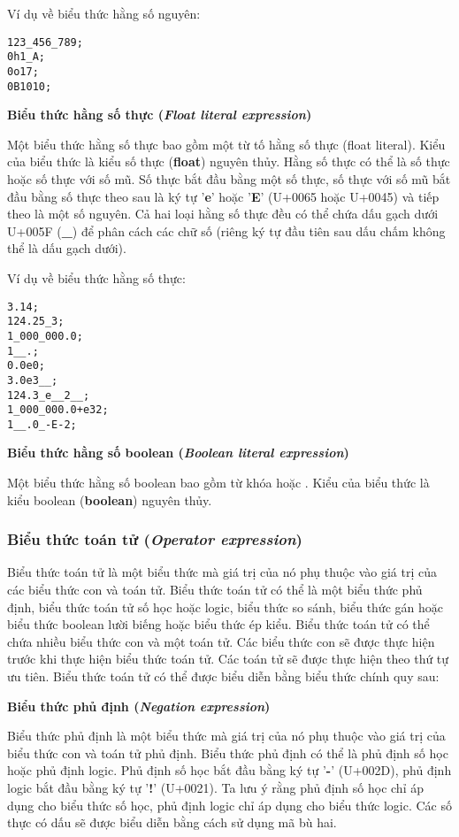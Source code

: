 \noindent Ví dụ về biểu thức hằng số nguyên:
\begin{lstlisting}[]
123_456_789;
0h1_A;
0o17;
0B1010;
\end{lstlisting}

\noindent\textbf{Biểu thức hằng số thực (\textit{Float literal expression})}

    Một biểu thức hằng số thực bao gồm một từ tố hằng số thực (float literal). Kiểu của biểu thức là kiểu số thực (\textbf{float}) nguyên thủy. Hằng số thực có thể là số thực hoặc số thực với số mũ. Số thực bắt đầu bằng một số thực, số thực với số mũ bắt đầu bằng số thực theo sau là ký tự '\textbf{e}' hoặc '\textbf{E}' (U+0065 hoặc U+0045) và tiếp theo là một số nguyên. Cả hai loại hằng số thực đều có thể chứa dấu gạch dưới U+005F (\textbf{\_}) để phân cách các chữ số (riêng ký tự đầu tiên sau dấu chấm không thể là dấu gạch dưới).

\noindent Ví dụ về biểu thức hằng số thực:
\begin{lstlisting}[]
3.14;
124.25_3;
1_000_000.0;
1__.;
0.0e0;
3.0e3__;
124.3_e__2__;
1_000_000.0+e32;
1__.0_-E-2;
\end{lstlisting}

\noindent\textbf{Biểu thức hằng số boolean (\textit{Boolean literal expression})}

    Một biểu thức hằng số boolean bao gồm từ khóa  hoặc . Kiểu của biểu thức là kiểu boolean (\textbf{boolean}) nguyên thủy.

\subsubsection{Biểu thức toán tử (\textit{Operator expression})}

    Biểu thức toán tử là một biểu thức mà giá trị của nó phụ thuộc vào giá trị của các biểu thức con và toán tử. Biểu thức toán tử có thể là một biểu thức phủ định, biểu thức toán tử số học hoặc logic, biểu thức so sánh, biểu thức gán hoặc biểu thức boolean lười biếng hoặc biểu thức ép kiểu. Biểu thức toán tử có thể chứa nhiều biểu thức con và một toán tử. Các biểu thức con sẽ được thực hiện trước khi thực hiện biểu thức toán tử. Các toán tử sẽ được thực hiện theo thứ tự ưu tiên. Biểu thức toán tử có thể được biểu diễn bằng biểu thức chính quy sau:

\regexopexpr

\noindent\textbf{Biểu thức phủ định (\textit{Negation expression})}

    Biểu thức phủ định là một biểu thức mà giá trị của nó phụ thuộc vào giá trị của biểu thức con và toán tử phủ định. Biểu thức phủ định có thể là phủ định số học hoặc phủ định logic. Phủ định số học bắt đầu bằng ký tự '\textbf{-}' (U+002D), phủ định logic bắt đầu bằng ký tự '\textbf{!}' (U+0021). Ta lưu ý rằng phủ định số học chỉ áp dụng cho biểu thức số học, phủ định logic chỉ áp dụng cho biểu thức logic. Các số thực có dấu sẽ được biểu diễn bằng cách sử dụng mã bù hai.

